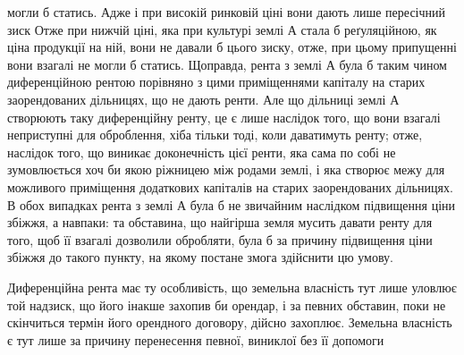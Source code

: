 могли б статись. Адже і при високій ринковій ціні вони дають лише пересічний
зиск Отже при нижчій ціні, яка при культурі землі $А$ стала б реґуляційною,
як ціна продукції на ній, вони не давали б цього зиску, отже, при цьому
припущенні вони взагалі не могли б статись. Щоправда, рента з землі
$А$ була б таким чином диференційною рентою порівняно з цими приміщеннями
капіталу на старих заорендованих дільницях, що не дають ренти. Але
що дільниці землі $А$ створюють таку диференційну ренту, це є лише наслідок
того, що вони взагалі неприступні для оброблення, хіба тільки тоді, коли
даватимуть ренту; отже, наслідок того, що виникає доконечність цієї ренти, яка
сама по собі не зумовлюється хоч би якою ріжницею між родами землі, і яка
створює межу для можливого приміщення додаткових капіталів на старих заорендованих
дільницях. В обох випадках рента з землі $А$ була б не звичайним
наслідком підвищення ціни збіжжя, а навпаки: та обставина, що найгірша
земля мусить давати ренту для того, щоб її взагалі дозволили обробляти, була б
за причину підвищення ціни збіжжя до такого пункту, на якому постане змога
здійснити цю умову.

Диференційна рента має ту особливість, що земельна власність тут лише
уловлює той надзиск, що його інакше захопив би орендар, і за певних обставин,
поки не скінчиться термін його орендного договору, дійсно захоплює. Земельна
власність є тут лише за причину перенесення певної, виниклої без її допомоги
\parbreak{}  %
